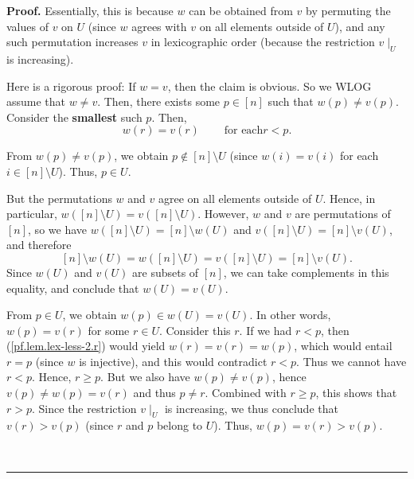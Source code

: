 \documentclass[numbers=enddot,12pt,final,onecolumn,notitlepage]{scrartcl}%
\numberwithin{exer}{subsection}
\theoremstyle{definition}
\newenvironment{fineprint}{\medskip \begin{small}}{\end{small} \medskip}
\newenvironment{proof}[1][Proof]{\noindent\textbf{#1.} }{\ \rule{0.5em}{0.5em}}
\begin{document}
\begin{proof}
Essentially, this is because $w$ can be obtained from $v$ by permuting the
values of $v$ on $U$ (since $w$ agrees with $v$ on all elements outside of
$U$), and any such permutation increases $v$ in lexicographic order (because
the restriction $v\mid_{U}$ is increasing).

\begin{fineprint}
Here is a rigorous proof: If $w=v$, then the claim is obvious. So we WLOG
assume that $w\neq v$. Then, there exists some $p\in\left[  n\right]  $ such
that $w\left(  p\right)  \neq v\left(  p\right)  $. Consider the
\textbf{smallest} such $p$. Then,%
\begin{equation}
w\left(  r\right)  =v\left(  r\right)  \ \ \ \ \ \ \ \ \ \ \text{for each
}r<p. \label{pf.lem.lex-less-2.r}%
\end{equation}


From $w\left(  p\right)  \neq v\left(  p\right)  $, we obtain $p\notin\left[
n\right]  \setminus U$ (since $w\left(  i\right)  =v\left(  i\right)  $ for
each $i\in\left[  n\right]  \setminus U$). Thus, $p\in U$.

But the permutations $w$ and $v$ agree on all elements outside of $U$. Hence,
in particular, $w\left(  \left[  n\right]  \setminus U\right)  =v\left(
\left[  n\right]  \setminus U\right)  $. However, $w$ and $v$ are permutations
of $\left[  n\right]  $, so we have $w\left(  \left[  n\right]  \setminus
U\right)  =\left[  n\right]  \setminus w\left(  U\right)  $ and $v\left(
\left[  n\right]  \setminus U\right)  =\left[  n\right]  \setminus v\left(
U\right)  $, and therefore%
\[
\left[  n\right]  \setminus w\left(  U\right)  =w\left(  \left[  n\right]
\setminus U\right)  =v\left(  \left[  n\right]  \setminus U\right)  =\left[
n\right]  \setminus v\left(  U\right)  .
\]
Since $w\left(  U\right)  $ and $v\left(  U\right)  $ are subsets of $\left[
n\right]  $, we can take complements in this equality, and conclude that
$w\left(  U\right)  =v\left(  U\right)  $.

From $p\in U$, we obtain $w\left(  p\right)  \in w\left(  U\right)  =v\left(
U\right)  $. In other words, $w\left(  p\right)  =v\left(  r\right)  $ for
some $r\in U$. Consider this $r$. If we had $r<p$, then
(\ref{pf.lem.lex-less-2.r}) would yield $w\left(  r\right)  =v\left(
r\right)  =w\left(  p\right)  $, which would entail $r=p$ (since $w$ is
injective), and this would contradict $r<p$. Thus we cannot have $r<p$. Hence,
$r\geq p$. But we also have $w\left(  p\right)  \neq v\left(  p\right)  $,
hence $v\left(  p\right)  \neq w\left(  p\right)  =v\left(  r\right)  $ and
thus $p\neq r$. Combined with $r\geq p$, this shows that $r>p$. Since the
restriction $v\mid_{U}$ is increasing, we thus conclude that $v\left(
r\right)  >v\left(  p\right)  $ (since $r$ and $p$ belong to $U$). Thus,
$w\left(  p\right)  =v\left(  r\right)  >v\left(  p\right)  $.


\end{fineprint}
\end{proof}
\end{document}

